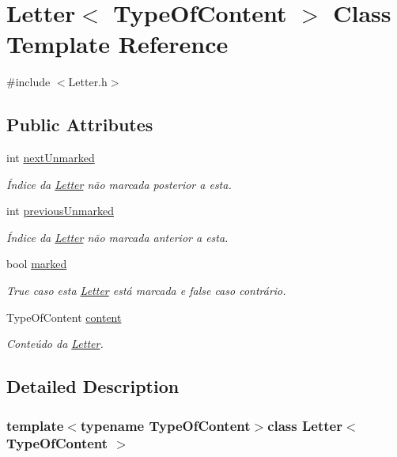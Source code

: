 \hypertarget{classLetter}{\section{Letter$<$ Type\+Of\+Content $>$ Class Template Reference}
\label{classLetter}
}


{\ttfamily \#include $<$Letter.\+h$>$}

\subsection*{Public Attributes}
\begin{DoxyCompactItemize}
\item 
int \hyperlink{classLetter_a88ed419ad80a3c9e773f2c2dd0fafe97}{next\+Unmarked}
\begin{DoxyCompactList}\small\item\em Índice da \hyperlink{classLetter}{Letter} não marcada posterior a esta. \end{DoxyCompactList}\item 
int \hyperlink{classLetter_a8b0435db39f7a35dd3874f981d7f19e6}{previous\+Unmarked}
\begin{DoxyCompactList}\small\item\em Índice da \hyperlink{classLetter}{Letter} não marcada anterior a esta. \end{DoxyCompactList}\item 
bool \hyperlink{classLetter_a720835d4e8e538b206ce5cb93da530a8}{marked}
\begin{DoxyCompactList}\small\item\em True caso esta \hyperlink{classLetter}{Letter} está marcada e false caso contrário. \end{DoxyCompactList}\item 
Type\+Of\+Content \hyperlink{classLetter_a9b3d3b6fe677bf9e96a034f71beda5c4}{content}
\begin{DoxyCompactList}\small\item\em Conteúdo da \hyperlink{classLetter}{Letter}. \end{DoxyCompactList}\end{DoxyCompactItemize}


\subsection{Detailed Description}
\subsubsection*{template$<$typename Type\+Of\+Content$>$class Letter$<$ Type\+Of\+Content $>$}


